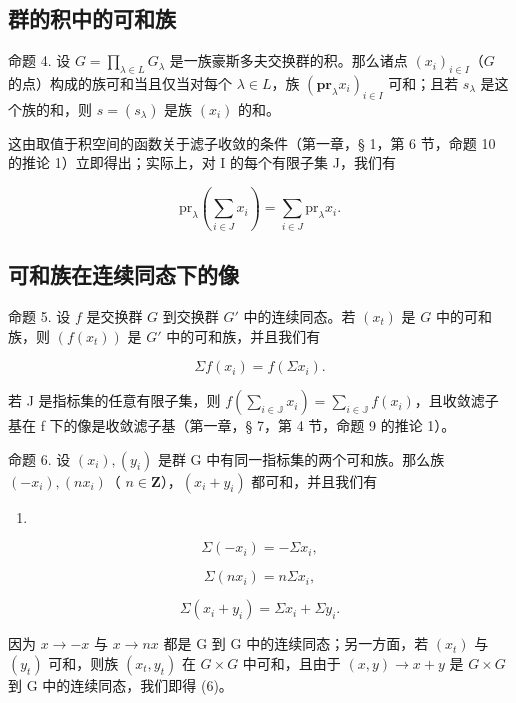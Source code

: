 \subsection{群的积中的可和族}

命题 4. 设 \(G = \prod_{\lambda \in L} G_{\lambda}\) 是一族豪斯多夫交换群的积。那么诸点 \((x_{i})_{i \in I}\)（\(G\) 的点）构成的族可和当且仅当对每个 \(\lambda \in L\)，族 \((\mathbf{pr}_{\lambda} x_{i})_{i \in I}\) 可和；且若 \(s_{\lambda}\) 是这个族的和，则 \(s = (s_{\lambda})\) 是族 \((x_{i})\) 的和。

这由取值于积空间的函数关于滤子收敛的条件（第一章，§ 1，第 6 节，命题 10 的推论 1）立即得出；实际上，对 I 的每个有限子集 J，我们有

\[
\mathrm{pr} _ {\lambda} \left(\sum_ {i \in J} x _ {i}\right) = \sum_ {i \in J} \mathrm{pr} _ {\lambda} x _ {i}.
\]

\subsection{可和族在连续同态下的像}

命题 5. 设 \(f\) 是交换群 \(G\) 到交换群 \(G'\) 中的连续同态。若 \((x_t)\) 是 \(G\) 中的可和族，则 \((f(x_t))\) 是 \(G'\) 中的可和族，并且我们有

\[
\Sigma f (x _ {i}) = f (\Sigma x _ {i}).\tag{3}
\]

若 J 是指标集的任意有限子集，则 \(f\left(\sum_{i \in \mathbb{J}} x_i\right) = \sum_{i \in \mathbb{J}} f(x_i)\)，且收敛滤子基在 f 下的像是收敛滤子基（第一章，§ 7，第 4 节，命题 9 的推论 1）。

命题 6. 设 \((x_{i}), (y_{i})\) 是群 G 中有同一指标集的两个可和族。那么族 \((-x_{i}), (nx_{i})\)（ \(n \in \mathbf{Z}\)），\((x_{i} + y_{i})\) 都可和，并且我们有

\begin{enumerate}
\def\labelenumi{(\arabic{enumi})}
\setcounter{enumi}{3}
\tightlist
\item
\end{enumerate}

\[
\Sigma (- x _ {i}) = - \Sigma x _ {i},\tag{5}
\]

\[
\Sigma (n x _ {i}) = n \Sigma x _ {i},\tag{6}
\]

\[
\Sigma (x _ {i} + y _ {i}) = \Sigma x _ {i} + \Sigma y _ {i}.
\]

因为 \(x \rightarrow -x\) 与 \(x \rightarrow nx\) 都是 G 到 G 中的连续同态；另一方面，若 \((x_{t})\) 与 \((y_{t})\) 可和，则族 \((x_{t}, y_{t})\) 在 \(G \times G\) 中可和，且由于 \((x, y) \rightarrow x + y\) 是 \(G \times G\) 到 G 中的连续同态，我们即得 (6)。

